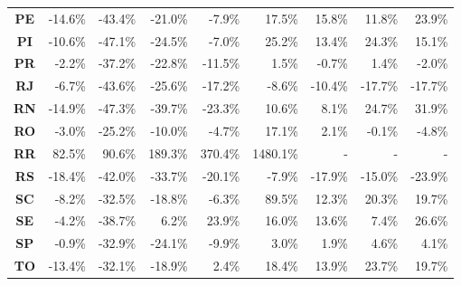 \begin{table}[htb]
\begin{tabular}{c|r|r|r|r|r|r|r|r}
        \textbf{PE} & -14.6\% & -43.4\% & -21.0\% &  -7.9\% &   17.5\% &    15.8\% &    11.8\% &   23.9\% \\
        \textbf{PI} & -10.6\% & -47.1\% & -24.5\% &  -7.0\% &   25.2\% &    13.4\% &    24.3\% &   15.1\% \\
        \textbf{PR} &  -2.2\% & -37.2\% & -22.8\% & -11.5\% &    1.5\% &    -0.7\% &     1.4\% &   -2.0\% \\
        \textbf{RJ} &  -6.7\% & -43.6\% & -25.6\% & -17.2\% &   -8.6\% &   -10.4\% &   -17.7\% &  -17.7\% \\
        \textbf{RN} & -14.9\% & -47.3\% & -39.7\% & -23.3\% &   10.6\% &     8.1\% &    24.7\% &   31.9\% \\
        \textbf{RO} &  -3.0\% & -25.2\% & -10.0\% &  -4.7\% &   17.1\% &     2.1\% &    -0.1\% &   -4.8\% \\
        \textbf{RR} &  82.5\% &  90.6\% & 189.3\% & 370.4\% & 1480.1\% & - & - & - \\
        \textbf{RS} & -18.4\% & -42.0\% & -33.7\% & -20.1\% &   -7.9\% &   -17.9\% &   -15.0\% &  -23.9\% \\
        \textbf{SC} &  -8.2\% & -32.5\% & -18.8\% &  -6.3\% &   89.5\% &    12.3\% &    20.3\% &   19.7\% \\
        \textbf{SE} &  -4.2\% & -38.7\% &   6.2\% &  23.9\% &   16.0\% &    13.6\% &     7.4\% &   26.6\% \\
        \textbf{SP} &  -0.9\% & -32.9\% & -24.1\% &  -9.9\% &    3.0\% &     1.9\% &     4.6\% &    4.1\% \\
        \textbf{TO} & -13.4\% & -32.1\% & -18.9\% &   2.4\% &   18.4\% &    13.9\% &    23.7\% &   19.7\% \\
        \bottomrule
    \end{tabular}
\fdadospesquisa
\end{table}

